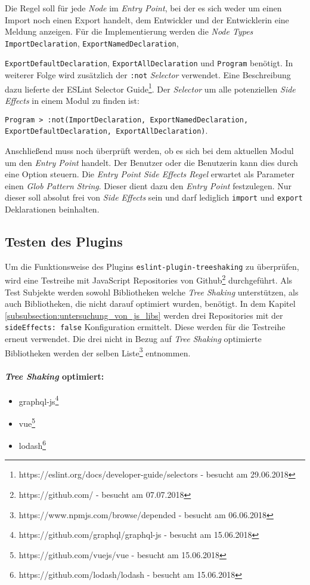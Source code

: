 Die Regel soll für jede \textit{Node} im \textit{Entry Point}, bei der es sich weder um einen Import noch einen Export handelt, dem Entwickler und der Entwicklerin eine Meldung anzeigen. Für die Implementierung werden die \textit{Node Types} \lstinline{ImportDeclaration}, \lstinline{ExportNamedDeclaration}, \raggedright\lstinline{ExportDefaultDeclaration}, \lstinline{ExportAllDeclaration} und \lstinline{Program} benötigt. In weiterer Folge wird zusätzlich der \lstinline{:not} \textit{Selector} verwendet. Eine Beschreibung dazu lieferte der ESLint Selector Guide\footnote{https://eslint.org/docs/developer-guide/selectors - besucht am 29.06.2018}. Der \textit{Selector} um alle potenziellen \textit{Side Effects} in einem Modul zu finden ist: \raggedright\lstinline{Program > :not(ImportDeclaration, ExportNamedDeclaration, ExportDefaultDeclaration, ExportAllDeclaration)}.

Anschließend muss noch überprüft werden, ob es sich bei dem aktuellen Modul um den \textit{Entry Point} handelt. Der Benutzer oder die Benutzerin kann dies durch eine Option steuern. Die \textit{Entry Point Side Effects Regel} erwartet als Parameter einen \textit{Glob Pattern String}. Dieser dient dazu den \textit{Entry Point} festzulegen. Nur dieser soll absolut frei von \textit{Side Effects} sein und darf lediglich \lstinline{import} und \lstinline{export} Deklarationen beinhalten.

\subsection{Testen des Plugins}
\label{subsection_testen_des_plugins}

Um die Funktionsweise des Plugins \lstinline{eslint-plugin-treeshaking} zu überprüfen, wird eine Testreihe mit JavaScript Repositories von Github\footnote{https://github.com/ - besucht am 07.07.2018} durchgeführt. Als Test Subjekte werden sowohl Bibliotheken welche \textit{Tree Shaking} unterstützen, als auch Bibliotheken, die nicht darauf optimiert wurden, benötigt. In dem Kapitel \ref{subsubsection:untersuchung_von_js_libs} werden drei Repositories mit der \lstinline{sideEffects: false} Konfiguration ermittelt. Diese werden für die Testreihe erneut verwendet. Die drei nicht in Bezug auf \textit{Tree Shaking} optimierte Bibliotheken werden der selben Liste\footnote{https://www.npmjs.com/browse/depended - besucht am 06.06.2018} entnommen. 

\paragraph{\textit{Tree Shaking} optimiert:}
\begin{itemize}
\item graphql-js\footnote{https://github.com/graphql/graphql-js - besucht am 15.06.2018} 
\item vue\footnote{https://github.com/vuejs/vue - besucht am 15.06.2018} 
\item lodash\footnote{https://github.com/lodash/lodash - besucht am 15.06.2018}
\end{itemize}

